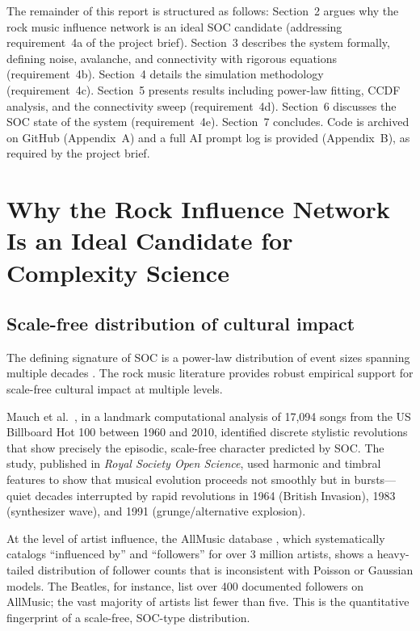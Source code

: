 \documentclass[12pt, a4paper]{article}
\begin{document}
The remainder of this report is structured as follows:
Section~2 argues why the rock music influence network is an
ideal SOC candidate (addressing requirement~4a of the project brief).
Section~3 describes the system formally, defining noise,
avalanche, and connectivity with rigorous equations
(requirement~4b).
Section~4 details the simulation methodology (requirement~4c).
Section~5 presents results including power-law fitting,
CCDF analysis, and the connectivity sweep
(requirement~4d).
Section~6 discusses the SOC state of the system
(requirement~4e).
Section~7 concludes.
Code is archived on GitHub (Appendix~A) and a full AI prompt
log is provided (Appendix~B), as required by the project brief.


\section{Why the Rock Influence Network Is an Ideal Candidate
for Complexity Science}
\label{sec:candidate}

\subsection{Scale-free distribution of cultural impact}

The defining signature of SOC is a power-law distribution of event
sizes spanning multiple decades \citep{bak1996, jensen1998}.
The rock music literature provides robust empirical support for
scale-free cultural impact at multiple levels.

Mauch et al.\ \citeyearpar{mauch2015}, in a landmark computational
analysis of 17,094 songs from the US Billboard Hot 100 between
1960 and 2010, identified discrete stylistic revolutions that
show precisely the episodic, scale-free character predicted by SOC.
The study, published in \textit{Royal Society Open Science},
used harmonic and timbral features to show that musical evolution
proceeds not smoothly but in bursts---quiet decades interrupted by
rapid revolutions in 1964 (British Invasion), 1983 (synthesizer
wave), and 1991 (grunge/alternative explosion).

At the level of artist influence, the AllMusic database
\citep{allmusic2024}, which systematically catalogs
``influenced by'' and ``followers'' for over 3 million artists,
shows a heavy-tailed distribution of follower counts that is
inconsistent with Poisson or Gaussian models.
The Beatles, for instance, list over 400 documented followers
on AllMusic; the vast majority of artists list fewer than five.
This is the quantitative fingerprint of a scale-free, SOC-type
distribution.
\end{document}
